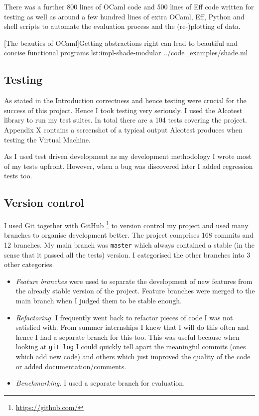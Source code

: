 \documentclass[class=article, crop=false]{standalone}
\begin{document}
There was a further 800 lines of OCaml code and 500 lines of Eff code written
for testing as well as around a few hundred lines of extra OCaml, Eff, Python
and shell scripts to automate the evaluation process and the (re-)plotting of
data.

{[The beauties of OCaml]Getting abstractions right can lead to beautiful and concise functional
programs}
{lst:impl-shade-modular}
{../code_examples/shade.ml}

\subsection{Testing}

As stated in the Introduction correctness and hence testing were crucial for
the success of this project. Hence I took testing very seriously. I used the
Alcotest library to run my test suites. In total there are a 104 tests covering
the project. Appendix X contains a screenshot of a typical output Alcotest
produces when testing the Virtual Machine.

As I used test driven development as my development methodology I wrote most of
my tests upfront. However, when a bug was discovered later I added regression
tests too.

\subsection{Version control}

I used Git together with GitHub
\footnote{\url{https://github.com/}}
to version control my project and used many branches to organise development
better. The project comprises 168 commits and 12 branches.
My main branch was \verb|master| which always contained a stable (in
the sense that it passed all the tests) version. I categorised the other
branches into 3 other categories.

\begin{itemize}
\item
\emph{Feature branches} were used to separate the development of new
features from the already stable version of the project. Feature branches were 
merged to the main branch when I judged them to be stable enough.

\item 
\emph{Refactoring.} I frequently went back to refactor pieces of code I was
not satisfied with. From summer internships I knew that I will do this often
and hence I had a separate branch for this too. This was useful because when
looking at \verb|git log| I could quickly tell apart the meaningful commits
(ones which add new code) and others which just improved the quality of the
code or added documentation/comments.

\item
\emph{Benchmarking.} I used a separate branch for evaluation.
\end{itemize}
\end{document}
